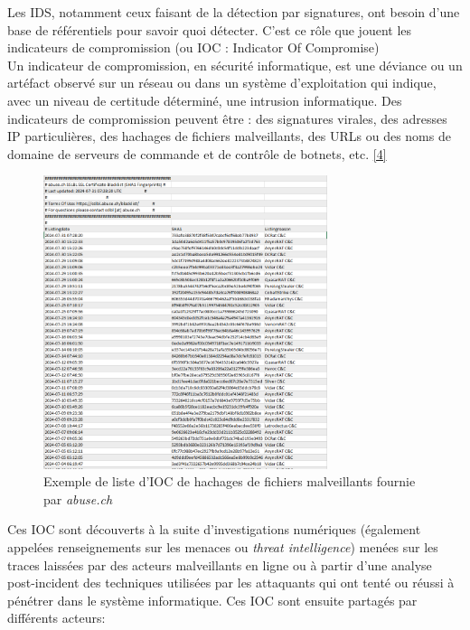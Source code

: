 \vspace{1em}

Les IDS, notamment ceux faisant de la détection par signatures, ont besoin d'une base de référentiels pour savoir quoi détecter. C'est ce rôle que jouent les indicateurs de compromission (ou IOC : Indicator Of Compromise)\\

Un indicateur de compromission, en sécurité informatique, est une déviance ou un artéfact observé sur un réseau ou dans un système d'exploitation qui indique, avec un niveau de certitude déterminé, une intrusion informatique. Des indicateurs de compromission peuvent être : des signatures virales, des adresses IP particulières, des hachages de fichiers malveillants, des URLs ou des noms de domaine de serveurs de commande et de contrôle de botnets, etc. \hyperref[biblio]{[4]}\\

\begin{figure}[h]%
    \center%
    \includegraphics[width=0.74\textwidth]{assets/IOC.png}
    \caption[Exemple de liste d'IOC de hachages de fichiers malveillants fournie par \textit{abuse.ch} (source: \href{https://sslbl.abuse.ch/blacklist/sslblacklist.csv}{sslbl.abuse.ch/blacklist/sslblacklist.csv})]{Exemple de liste d'IOC de hachages de fichiers malveillants fournie par \textit{abuse.ch}}\label{fig:ioc}
\end{figure}

\newpage

Ces IOC sont découverts à la suite d'investigations numériques (également appelées renseignements sur les menaces ou \textit{threat intelligence}) menées sur les traces laissées par des acteurs malveillants en ligne ou à partir d'une analyse post-incident des techniques utilisées par les attaquants qui ont tenté ou réussi à pénétrer dans le système informatique. Ces IOC sont ensuite partagés par différents acteurs:\\

